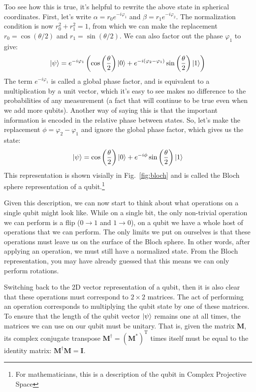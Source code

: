 Too see how this is true, it's helpful to rewrite the above state in spherical coordinates. First, let's
write $\alpha = r_0e^{-i\varphi_1}$ and $\beta = r_1e^{-i\varphi_2}$. The normalization condition is now
$r_0^2 + r_1^2 = 1$, from which we can make the replacement $r_0 = \cos(\theta/2)$ and $r_1 = \sin(\theta/2)$.
We can also factor out the phase $\varphi_1$ to give:
\begin{equation}
\ket{\psi} = e^{-i\varphi_1}\left(
    \cos\left(\frac{\theta}{2}\right)\ket{0} + e^{-i(\varphi_2 - \varphi_1)}\sin\left(\frac{\theta}{2}\right)\ket{1}
  \right)
\end{equation}
The term $e^{-i\varphi_1}$ is called a global phase factor, and is equivalent to a multiplication by a unit vector,
which it's easy to see makes no difference to the probabilities of any measurement (a fact that will continue to be
true even when we add more qubits). Another way of saying this is that the important information is encoded in
the relative phase between states. So, let's make the replacement $\phi = \varphi_2 - \varphi_1$ and ignore
the global phase factor, which gives us the state:
\begin{equation}
  \ket{\psi} = \cos\left(\frac{\theta}{2}\right)\ket{0} + e^{-i\phi}\sin\left(\frac{\theta}{2}\right)\ket{1}
\end{equation}
This representation is shown visially in Fig.~\ref{fig:bloch} and is called the Bloch sphere representation
of a qubit.\footnote{For mathematicians, this is a description of the qubit in Complex Projective Space}

Given this description, we can now start to think about what operations on a single qubit might look like.
While on a single bit, the only non-trivial operation we can perform is a flip ($0 \rightarrow 1$ and $1 \rightarrow 0$),
on a qubit we have a whole host of operations that we can perform. The only limits we put on ourselves is that these operations
must leave us on the surface of the Bloch sphere. In other words, after applying an operation, we must still
have a normalized state. From the Bloch representation, you may have already guessed that this means we
can only perform rotations.

Switching back to the 2D vector representation of a qubit, then it is also clear that these operations
must correspond to $2\times2$ matrices. The act of performing an operation corresponds to multiplying
the qubit state by one of these matrices. To ensure that the length of the qubit vector $\ket{\psi}$
remains one at all times, the matrices we can use on our qubit must be unitary. That is, given the matrix $\boldsymbol{M}$,
its complex conjugate transpose $\boldsymbol{M}^\dagger = (\boldsymbol{M^{*}})^\mathrm{T}$ times itself must be equal to
the identity matrix: $\boldsymbol{M}^\dagger\boldsymbol{M} = \boldsymbol{I}$.

